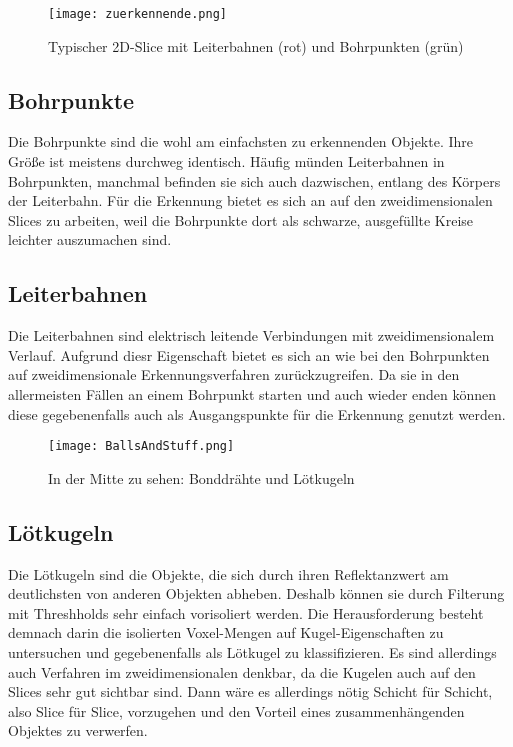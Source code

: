 \begin{figure}[H]
  \begin{center}
    \texttt{[image: zuerkennende.png]}
    \caption{Typischer 2D-Slice mit Leiterbahnen (rot) und Bohrpunkten (grün)}
    \label{fig:zuerkennende1}
  \end{center}
\end{figure}

\subsection{Bohrpunkte}
Die Bohrpunkte sind die wohl am einfachsten zu erkennenden Objekte. Ihre Größe ist meistens durchweg identisch. Häufig münden Leiterbahnen in Bohrpunkten, manchmal befinden sie sich auch dazwischen, entlang des Körpers der Leiterbahn. Für die Erkennung bietet es sich an auf den zweidimensionalen Slices zu arbeiten, weil die Bohrpunkte dort als schwarze, ausgefüllte Kreise leichter auszumachen sind.

\subsection{Leiterbahnen}
Die Leiterbahnen sind elektrisch leitende Verbindungen mit zweidimensionalem Verlauf. Aufgrund diesr Eigenschaft bietet es sich an wie bei den Bohrpunkten auf zweidimensionale Erkennungsverfahren zurückzugreifen. Da sie in den allermeisten Fällen an einem Bohrpunkt starten und auch wieder enden können diese gegebenenfalls auch als Ausgangspunkte für die Erkennung genutzt werden.

\begin{figure}[H]
  \begin{center}
    \texttt{[image: BallsAndStuff.png]}
    \caption{In der Mitte zu sehen: Bonddrähte und Lötkugeln}
    \label{fig:BallsAndBonds}
  \end{center}
\end{figure}

\subsection{Lötkugeln}
Die Lötkugeln sind die Objekte, die sich durch ihren Reflektanzwert am deutlichsten von anderen Objekten abheben. Deshalb können sie durch Filterung mit Threshholds sehr einfach vorisoliert werden. Die Herausforderung besteht demnach darin die isolierten Voxel-Mengen auf Kugel-Eigenschaften zu untersuchen und gegebenenfalls als Lötkugel zu klassifizieren. Es sind allerdings auch Verfahren im zweidimensionalen denkbar, da die Kugelen auch auf den Slices sehr gut sichtbar sind. Dann wäre es allerdings nötig Schicht für Schicht, also Slice für Slice, vorzugehen und den Vorteil eines zusammenhängenden Objektes zu verwerfen.

